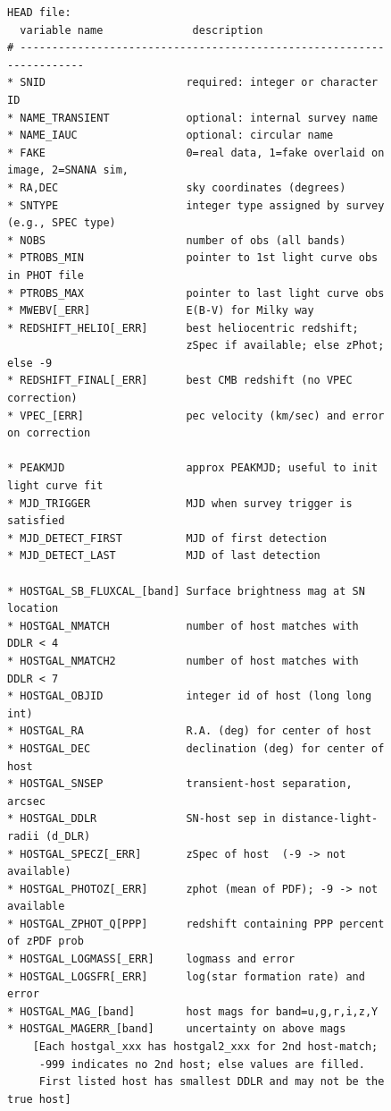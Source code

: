 \documentclass[12pt]{article}
\begin{document}
{\begin{figure} [ht] 
\begin{center}
\begin{Verbatim}[frame=single]
HEAD file:   
  variable name              description
# ---------------------------------------------------------------------
* SNID                      required: integer or character ID
* NAME_TRANSIENT            optional: internal survey name
* NAME_IAUC                 optional: circular name
* FAKE                      0=real data, 1=fake overlaid on image, 2=SNANA sim, 
* RA,DEC                    sky coordinates (degrees)
* SNTYPE                    integer type assigned by survey (e.g., SPEC type)
* NOBS                      number of obs (all bands)
* PTROBS_MIN                pointer to 1st light curve obs in PHOT file
* PTROBS_MAX                pointer to last light curve obs
* MWEBV[_ERR]               E(B-V) for Milky way
* REDSHIFT_HELIO[_ERR]      best heliocentric redshift;
                            zSpec if available; else zPhot; else -9
* REDSHIFT_FINAL[_ERR]      best CMB redshift (no VPEC correction)
* VPEC_[ERR]                pec velocity (km/sec) and error on correction

* PEAKMJD                   approx PEAKMJD; useful to init light curve fit
* MJD_TRIGGER               MJD when survey trigger is satisfied
* MJD_DETECT_FIRST          MJD of first detection
* MJD_DETECT_LAST           MJD of last detection

* HOSTGAL_SB_FLUXCAL_[band] Surface brightness mag at SN location
* HOSTGAL_NMATCH            number of host matches with DDLR < 4
* HOSTGAL_NMATCH2           number of host matches with DDLR < 7
* HOSTGAL_OBJID             integer id of host (long long int)
* HOSTGAL_RA                R.A. (deg) for center of host
* HOSTGAL_DEC               declination (deg) for center of host
* HOSTGAL_SNSEP             transient-host separation, arcsec
* HOSTGAL_DDLR              SN-host sep in distance-light-radii (d_DLR)
* HOSTGAL_SPECZ[_ERR]       zSpec of host  (-9 -> not available)
* HOSTGAL_PHOTOZ[_ERR]      zphot (mean of PDF); -9 -> not available
* HOSTGAL_ZPHOT_Q[PPP]      redshift containing PPP percent of zPDF prob
* HOSTGAL_LOGMASS[_ERR]     logmass and error
* HOSTGAL_LOGSFR[_ERR]      log(star formation rate) and error
* HOSTGAL_MAG_[band]        host mags for band=u,g,r,i,z,Y
* HOSTGAL_MAGERR_[band]     uncertainty on above mags
    [Each hostgal_xxx has hostgal2_xxx for 2nd host-match;
     -999 indicates no 2nd host; else values are filled.
     First listed host has smallest DDLR and may not be the true host]
    

\end{Verbatim}
\end{center}
\end{figure}}
\end{document}
